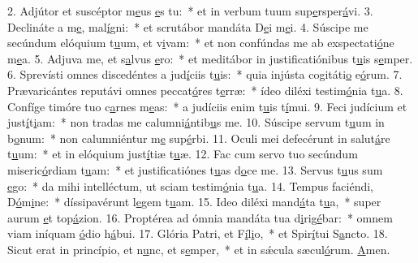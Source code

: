 2. Adjútor et suscéptor m\uline{e}us \uline{e}s tu:~* et in verbum tuum sup\uline{e}rsper\uline{á}vi.
3. Declináte a m\uline{e}, mal\uline{í}gni:~* et scrutábor mandáta D\uline{e}i m\uline{e}i.
4. Súscipe me secúndum elóquium t\uline{u}um, et v\uline{i}vam:~* et non confúndas me ab exspectati\uline{ó}ne m\uline{e}a.
5. Adjuva me, et s\uline{a}lvus \uline{e}ro:~* et meditábor in justificatiónibus t\uline{u}is s\uline{e}mper.
6. Sprevísti omnes discedéntes a jud\uline{í}ciis t\uline{u}is:~* quia injústa cogitáti\uline{o} e\uline{ó}rum.
7. Prævaricántes reputávi omnes peccat\uline{ó}res t\uline{e}rræ:~* ídeo diléxi testim\uline{ó}nia t\uline{u}a.
8. Confíge timóre tuo c\uline{a}rnes m\uline{e}as:~* a judíciis enim t\uline{u}is t\uline{í}mui.
9. Feci judícium et just\uline{í}t\uline{i}am:~* non tradas me calumni\uline{á}ntib\uline{u}s me.
10. Súscipe servum t\uline{u}um in b\uline{o}num:~* non calumniéntur m\uline{e} sup\uline{é}rbi.
11. Oculi mei defecérunt in salut\uline{á}re t\uline{u}um:~* et in elóquium just\uline{í}tiæ t\uline{u}æ.
12. Fac cum servo tuo secúndum miseric\uline{ó}rdiam t\uline{u}am:~* et justificatiónes t\uline{u}as d\uline{o}ce me.
13. Servus t\uline{u}us sum \uline{e}go:~* da mihi intelléctum, ut sciam testim\uline{ó}nia t\uline{u}a.
14. Tempus faciéndi, D\uline{ó}m\uline{i}ne:~* díssipavérunt l\uline{e}gem t\uline{u}am.
15. Ideo diléxi mand\uline{á}ta t\uline{u}a,~* super aurum \uline{e}t top\uline{á}zion.
16. Proptérea ad ómnia mandáta tua d\uline{i}rig\uline{é}bar:~* omnem viam iníquam \uline{ó}dio h\uline{á}bui.
17. Glória Patri, et F\uline{í}l\uline{i}o,~* et Spir\uline{í}tui S\uline{a}ncto.
18. Sicut erat in princípio, et n\uline{u}nc, et s\uline{e}mper,~* et in sǽcula sæcul\uline{ó}rum. \uline{A}men.
